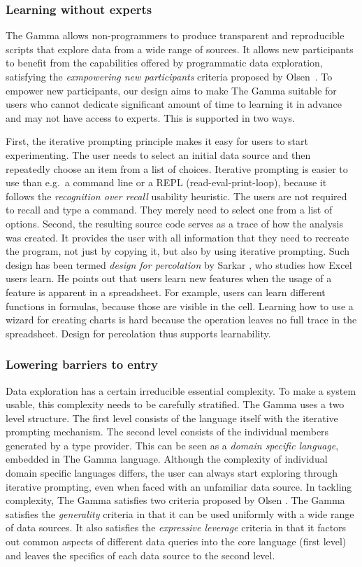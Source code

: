 \documentclass[manuscript,review,anonymous]{acmart}
\begin{document}
\subsubsection*{Learning without experts}
The Gamma allows non-programmers to produce transparent and reproducible scripts that explore
data from a wide range of sources. It allows new participants to benefit from the capabilities
offered by programmatic data exploration, satisfying the \emph{exmpowering new participants}
criteria proposed by Olsen~\cite{evaluating}. To empower new participants, our design aims to
make The Gamma suitable for users who cannot dedicate significant amount of time to learning
it in advance and may not have access to experts. This is supported in two ways.

First, the iterative prompting principle makes it easy for users to start experimenting.
The user needs to select an initial data source and then repeatedly choose an
item from a list of choices. Iterative prompting is easier to use than e.g.~a command line or a REPL
(read-eval-print-loop), because it follows the \emph{recognition over recall} usability heuristic.
The users are not required to recall and type a command. They merely need to select one from a
list of options. Second, the resulting source code serves as a trace of how the analysis was
created. It provides the user with all information that they need to recreate the
program, not just by copying it, but also by using iterative prompting. Such design
has been termed \emph{design for percolation} by Sarkar \cite{learning}, who studies how Excel users
learn. He points out that users learn new features when the usage of a feature is apparent in a spreadsheet.
For example, users can learn different functions in formulas, because those are visible in the cell.
Learning how to use a wizard for creating charts is hard because the operation leaves no
full trace in the spreadsheet. Design for percolation thus supports learnability.

\subsubsection*{Lowering barriers to entry}

Data exploration has a certain irreducible essential complexity. To make a system usable, this
complexity needs to be carefully stratified. The Gamma uses a two level structure. The first level
consists of the language itself with the iterative prompting mechanism. The second level consists of
the individual members generated by a type provider. This can be seen as a \emph{domain specific
language}, embedded in The Gamma language. Although the complexity of individual domain specific
languages differs, the user can always start exploring through iterative prompting, even when
faced with an unfamiliar data source.
%
In tackling complexity, The Gamma satisfies two criteria proposed by Olsen \cite{evaluating}.
The Gamma satisfies the \emph{generality} criteria in that it can be used uniformly with a wide
range of data sources. It also satisfies the \emph{expressive leverage} criteria in that it factors
out common aspects of different data queries into the core language (first level) and leaves the
specifics of each data source to the second level.
\end{document}
